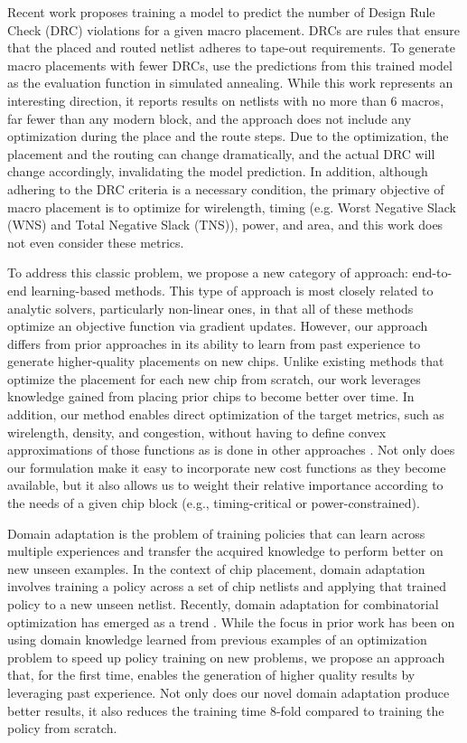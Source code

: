 \documentclass{article}
\begin{document}
Recent work \cite{cnnplacer19} proposes training a model to predict the number of Design Rule Check (DRC) violations for a given macro placement. DRCs are rules that ensure that the placed and routed netlist adheres to tape-out requirements. To generate macro placements with fewer DRCs, \cite{cnnplacer19} use the predictions from this trained model as the evaluation function in simulated annealing. While this work represents an interesting direction, it reports results on netlists with no more than 6 macros, far fewer than any modern block, and the approach does not include any optimization during the place and the route steps. Due to the optimization, the placement and the routing can change dramatically, and the actual DRC will change accordingly, invalidating the model prediction. In addition, although adhering to the DRC criteria is a necessary condition, the primary objective of macro placement is to optimize for wirelength, timing (e.g. Worst Negative Slack (WNS) and Total Negative Slack (TNS)), power, and area, and this work does not even consider these metrics. 

To address this classic problem, we propose a new category of approach: end-to-end learning-based methods. This type of approach is most closely related to analytic solvers, particularly non-linear ones, in that all of these methods optimize an objective function via gradient updates. However, our approach differs from prior approaches in its ability to learn from past experience to generate higher-quality placements on new chips. Unlike existing methods that optimize the placement for each new chip from scratch, our work leverages knowledge gained from placing prior chips to become better over time. In addition, our method enables direct optimization of the target metrics, such as wirelength, density, and congestion, without having to define convex approximations of those functions as is done in other approaches \cite{RePlAce19,EPlace15}. Not only does our formulation make it easy to incorporate new cost functions as they become available, but it also allows us to weight their relative importance according to the needs of a given chip block (e.g., timing-critical or power-constrained).

Domain adaptation is the problem of training policies that can learn across multiple experiences and transfer the acquired knowledge to perform better on new unseen examples. In the context of chip placement, domain adaptation involves training a policy across a set of chip netlists and applying that trained policy to a new unseen netlist. Recently, domain adaptation for combinatorial optimization has emerged as a trend \cite{zhou2019gdp,REGAL19,Placeto18}. While the focus in prior work has been on using domain knowledge learned from previous examples of an optimization problem to speed up policy training on new problems, we propose an approach that, for the first time, enables the generation of higher quality results by leveraging past experience. Not only does our novel domain adaptation produce better results, it also reduces the training time 8-fold compared to training the policy from scratch.
\end{document}
